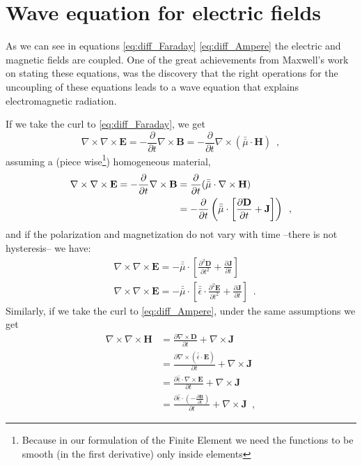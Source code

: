 \section{Wave equation for electric fields}

As we can see in equations \ref{eq:diff_Faraday} \ref{eq:diff_Ampere} the electric and magnetic fields are coupled. One of the great achievements from Maxwell's work on stating these equations, was the discovery that the right operations for the uncoupling of these equations leads to a wave equation that explains electromagnetic radiation.

If we take the curl to \eqref{eq:diff_Faraday}, we get
\[ \nabla\times\nabla\times\mathbf{E} = -\frac{\partial}{\partial t} \nabla\times \mathbf{B} = -\frac{\partial}{\partial t} \nabla\times (\bar{\bar{\mu}} \cdot \mathbf{H}) \enspace , \]
assuming a (piece wise\footnote{Because in our formulation of the Finite Element we need the functions to be smooth (in the first derivative) only inside elements}) homogeneous material,
\begin{align*}
\nabla\times\nabla\times \mathbf{E} = - \frac{\partial}{\partial t} \nabla\times \mathbf{B} &= \- \frac{\partial}{\partial t} ( \bar{\bar{\mu}}\cdot \nabla\times \mathbf{H})\\
&= -\frac{\partial}{\partial t} \left( \bar{\bar{\mu}}\cdot \left[ \frac{\partial \mathbf{D}}{\partial t} + \mathbf{J}\right] \right)\enspace ,
\end{align*}
and if the polarization and magnetization do not vary with time --there is not hysteresis-- we have:
\begin{align}
&\nabla\times\nabla\times \mathbf{E} = -\bar{\bar{\mu}}\cdot \left[ \frac{\partial^2 \mathbf{D}}{\partial t^2} + \frac{\partial \mathbf{J}}{\partial t} \right] \nonumber \\
&\nabla\times\nabla\times \mathbf{E} = -\bar{\bar{\mu}}\cdot \left[ \bar{\bar{\epsilon}}\cdot\frac{\partial^2 \mathbf{E}}{\partial t^2} + \frac{\partial \mathbf{J}}{\partial t} \right] \label{eq:E-wave-loads} \enspace .
\end{align}
Similarly, if we take the curl to \eqref{eq:diff_Ampere}, under the same assumptions we get
\begin{align*}
\nabla\times\nabla\times \mathbf{H} &= \frac{\partial \nabla\times \mathbf{D}}{\partial t} + \nabla\times \mathbf{J}\\
&= \frac{\partial \nabla\times (\bar{\bar{\epsilon}}\cdot\mathbf{E})}{\partial t} + \nabla\times \mathbf{J}\\
&= \frac{\partial  \bar{\bar{\epsilon}}\cdot\nabla\times\mathbf{E}}{\partial t} + \nabla\times \mathbf{J}\\
&= \frac{\partial  \bar{\bar{\epsilon}}\cdot\left(-\frac{\partial \mathbf{B}}{\partial t}\right)}{\partial t} + \nabla\times \mathbf{J} \enspace ,
\end{align*}
